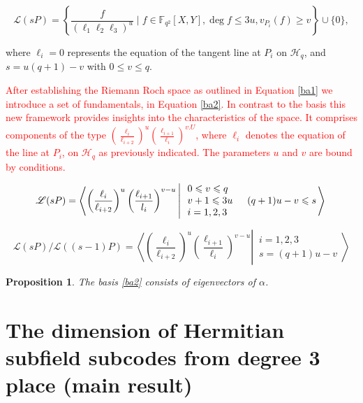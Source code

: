 \documentclass[a4paper]{amsart}
\theoremstyle{plain}
\newtheorem{proposition}[theorem]{Proposition}
\theoremstyle{definition}
\theoremstyle{remark}
\begin{document}
\begin{equation}\label{ba1}
	\mathscr{L}(sP) = \left\{ \frac{f}{(\ell_1\ell_2\ell_3)^u} \mid f \in \mathbb{F}_{q^2}[X,Y], \deg f \leq 3u, v_{P_i}(f) \geq v \right\} \cup \{0\},
\end{equation}


where $\ell_i=0$ represents the equation of the tangent line at $P_i$ on $\mathscr{H}_q$, and $s = u(q+1) - v$ with $0 \leq v \leq q$.

\textcolor{red}{
After establishing the Riemann Roch space as outlined in Equation \ref{ba1} we introduce a set of fundamentals, in Equation \ref{ba2}. In contrast to the basis this new framework provides insights into the characteristics of the space. It comprises components of the type $\left(\frac{\ell_i}{\ell_{i+2}}\right)^u\left(\frac{\ell_{i+1}}{\ell_i}\right)^{v. U}$, where $\ell_i$ denotes the equation of the line at $P_i$, on $\mathscr{H}_q$ as previously indicated. The parameters $u$ and  $v$ are bound by conditions.}

\begin{equation} \label{ba2}
	\mathscr{L}(s P)=\left\langle\left(\frac{\ell_i}{\ell_{i+2}}\right)^u\left(\frac{\ell_{i+1}}{l_i}\right)^{v - u} \left\lvert\, \begin{array}{l}
		0 \leqslant v \leqslant q \\
		v+1 \leqslant 3 u \\
		i=1,2,3
	\end{array} \quad(q+1) u-v \leqslant s\right.\right\rangle \\
\end{equation}

\begin{equation}\label{ba3}
	\mathscr{L}(s P) / \mathcal{L}((s-1) P)=\left\langle\left.\left(\frac{\ell_i}{\ell_{i+2}}\right)^u\left(\frac{\ell_{i+1}}{\ell_i}\right)^{v-u} \right\rvert\, \begin{array}{l}
		i=1,2,3 \\
		s=(q+1) u-v 
	\end{array}\right\rangle
\end{equation}

\begin{proposition}
	The basis \ref{ba2} consists of eigenvectors of $\alpha$.
\end{proposition}
\section{The dimension of Hermitian subfield subcodes from degree 3 place (main result)}
\end{document}
